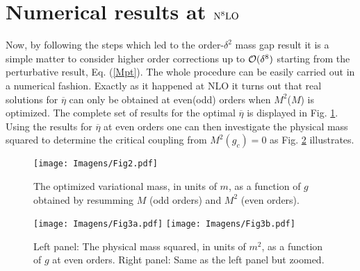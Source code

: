 \documentclass[a4paper,11pt]{article}
\begin{document}
 


\section{Numerical results at ${\rm N}^8{\rm LO}$}

Now, by following the steps which led to the order-$\delta^2$ mass gap result it is a simple matter to consider higher order corrections up to ${\cal O}(\delta^8)$ starting from  the perturbative result, Eq. (\ref {Mpt}). The whole procedure can be easily carried out in a numerical fashion. Exactly as it happened at NLO it turns out that real solutions  for $\overline \eta$ can only be obtained at even(odd) orders when $M^2$($M$) is optimized. The complete set of results for the optimal $\overline \eta$ is displayed in Fig. \ref {Fig2}. Using the results for  $\overline \eta$ at even orders one can then investigate the physical mass squared to determine the critical coupling from $M^2(g_c)=0$ as Fig. \ref{Fig3} illustrates.


\begin{figure}[ht!]
    \centering
    \texttt{[image: Imagens/Fig2.pdf]}
    \caption{The optimized variational mass, in units of $m$, as a function of $g$ obtained by resumming $M$ (odd orders) and $M^2$ (even orders).}
    \label{Fig2}
\end{figure}

\begin{figure}[ht!]

    \centering
    \texttt{[image: Imagens/Fig3a.pdf]}
    \qquad
     \texttt{[image: Imagens/Fig3b.pdf]}
    \caption{Left panel: The physical mass squared, in units of $m^2$,  as a function of $g$ at even orders. Right panel: Same as the left panel but zoomed. }
    \label{Fig3}
\end{figure}
\noindent
\end{document}
